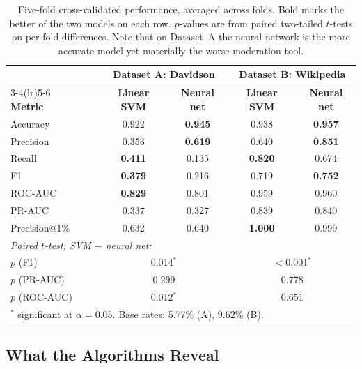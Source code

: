 \begin{table}[h]
\centering
\caption{Five-fold cross-validated performance, averaged across folds. Bold marks the
better of the two models on each row. $p$-values are from paired two-tailed $t$-tests on
per-fold differences. Note that on Dataset~A the neural network is the more accurate model
yet materially the worse moderation tool.}
\label{tab:results}
\begin{tabular}{llcccc}
\toprule
& & \multicolumn{2}{c}{\textbf{Dataset A: Davidson}} & \multicolumn{2}{c}{\textbf{Dataset B: Wikipedia}} \\
\cmidrule(lr){3-4}\cmidrule(lr){5-6}
\textbf{Metric} & & \textbf{Linear SVM} & \textbf{Neural net} & \textbf{Linear SVM} & \textbf{Neural net} \\
\midrule
Accuracy      & & 0.922 & \textbf{0.945} & 0.938 & \textbf{0.957} \\
Precision     & & 0.353 & \textbf{0.619} & 0.640 & \textbf{0.851} \\
Recall        & & \textbf{0.411} & 0.135 & \textbf{0.820} & 0.674 \\
F1            & & \textbf{0.379} & 0.216 & 0.719 & \textbf{0.752} \\
ROC-AUC       & & \textbf{0.829} & 0.801 & 0.959 & 0.960 \\
PR-AUC        & & 0.337 & 0.327 & 0.839 & 0.840 \\
Precision@1\% & & 0.632 & 0.640 & \textbf{1.000} & 0.999 \\
\midrule
\multicolumn{6}{l}{\emph{Paired $t$-test, SVM $-$ neural net:}} \\
$p$ (F1)      & & \multicolumn{2}{c}{0.014$^{*}$} & \multicolumn{2}{c}{$<$0.001$^{*}$} \\
$p$ (PR-AUC)  & & \multicolumn{2}{c}{0.299} & \multicolumn{2}{c}{0.778} \\
$p$ (ROC-AUC) & & \multicolumn{2}{c}{0.012$^{*}$} & \multicolumn{2}{c}{0.651} \\
\bottomrule
\multicolumn{6}{l}{\footnotesize $^{*}$ significant at $\alpha = 0.05$. Base rates: 5.77\% (A), 9.62\% (B).}
\end{tabular}
\end{table}

\subsection{What the Algorithms Reveal}
\label{subsec:What the Algorithms Reveal}

